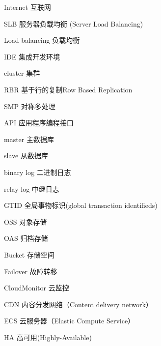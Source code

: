 \begin{denotation}[3cm]
\item[Internet] 互联网
\item[SLB] 服务器负载均衡 (Server Load Balancing)
\item[Load balancing] 负载均衡
\item[IDE] 集成开发环境
\item[cluster] 集群
\item[RBR] 基于行的复制Row Based Replication
\item[SMP] 对称多处理
\item[API] 应用程序编程接口
\item[master] 主数据库
\item[slave] 从数据库
\item[binary log] 二进制日志
\item[relay log] 中继日志
\item[GTID] 全局事物标识(global transaction identifieds)
\item[OSS] 对象存储
\item[OAS] 归档存储
\item[Bucket] 存储空间
\item[Failover] 故障转移
\item[CloudMonitor] 云监控
\item[CDN] 内容分发网络（Content delivery network）
\item[ECS] 云服务器（Elastic Compute Service）
\item[HA] 高可用(Highly-Available)
\end{denotation}
